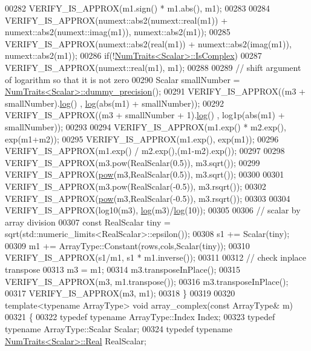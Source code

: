 \begin{DoxyCode}
00282   VERIFY\_IS\_APPROX(m1.sign() * m1.abs(), m1);
00283 
00284   VERIFY\_IS\_APPROX(numext::abs2(numext::real(m1)) + numext::abs2(numext::imag(m1)), numext::abs2(m1));
00285   VERIFY\_IS\_APPROX(numext::abs2(real(m1)) + numext::abs2(imag(m1)), numext::abs2(m1));
00286   \textcolor{keywordflow}{if}(!\hyperlink{group___core___module_struct_eigen_1_1_num_traits}{NumTraits<Scalar>::IsComplex})
00287     VERIFY\_IS\_APPROX(numext::real(m1), m1);
00288 
00289   \textcolor{comment}{// shift argument of logarithm so that it is not zero}
00290   Scalar smallNumber = \hyperlink{group___core___module_struct_eigen_1_1_num_traits}{NumTraits<Scalar>::dummy\_precision}();
00291   VERIFY\_IS\_APPROX((m3 + smallNumber).\hyperlink{structlog}{log}() , \hyperlink{structlog}{log}(abs(m1) + smallNumber));
00292   VERIFY\_IS\_APPROX((m3 + smallNumber + 1).\hyperlink{structlog}{log}() , log1p(abs(m1) + smallNumber));
00293 
00294   VERIFY\_IS\_APPROX(m1.exp() * m2.exp(), exp(m1+m2));
00295   VERIFY\_IS\_APPROX(m1.exp(), exp(m1));
00296   VERIFY\_IS\_APPROX(m1.exp() / m2.exp(),(m1-m2).exp());
00297 
00298   VERIFY\_IS\_APPROX(m3.pow(RealScalar(0.5)), m3.sqrt());
00299   VERIFY\_IS\_APPROX(\hyperlink{group___core___module_ab6dc101d82e8228a19a8840e3a29c1c9}{pow}(m3,RealScalar(0.5)), m3.sqrt());
00300 
00301   VERIFY\_IS\_APPROX(m3.pow(RealScalar(-0.5)), m3.rsqrt());
00302   VERIFY\_IS\_APPROX(\hyperlink{group___core___module_ab6dc101d82e8228a19a8840e3a29c1c9}{pow}(m3,RealScalar(-0.5)), m3.rsqrt());
00303 
00304   VERIFY\_IS\_APPROX(log10(m3), \hyperlink{structlog}{log}(m3)/\hyperlink{structlog}{log}(10));
00305 
00306   \textcolor{comment}{// scalar by array division}
00307   \textcolor{keyword}{const} RealScalar tiny = sqrt(std::numeric\_limits<RealScalar>::epsilon());
00308   s1 += Scalar(tiny);
00309   m1 += ArrayType::Constant(rows,cols,Scalar(tiny));
00310   VERIFY\_IS\_APPROX(s1/m1, s1 * m1.inverse());
00311 
00312   \textcolor{comment}{// check inplace transpose}
00313   m3 = m1;
00314   m3.transposeInPlace();
00315   VERIFY\_IS\_APPROX(m3, m1.transpose());
00316   m3.transposeInPlace();
00317   VERIFY\_IS\_APPROX(m3, m1);
00318 \}
00319 
00320 \textcolor{keyword}{template}<\textcolor{keyword}{typename} ArrayType> \textcolor{keywordtype}{void} array\_complex(\textcolor{keyword}{const} ArrayType& m)
00321 \{
00322   \textcolor{keyword}{typedef} \textcolor{keyword}{typename} ArrayType::Index Index;
00323   \textcolor{keyword}{typedef} \textcolor{keyword}{typename} ArrayType::Scalar Scalar;
00324   \textcolor{keyword}{typedef} \textcolor{keyword}{typename} \hyperlink{group___core___module_struct_eigen_1_1_num_traits}{NumTraits<Scalar>::Real} RealScalar;

\end{DoxyCode}
